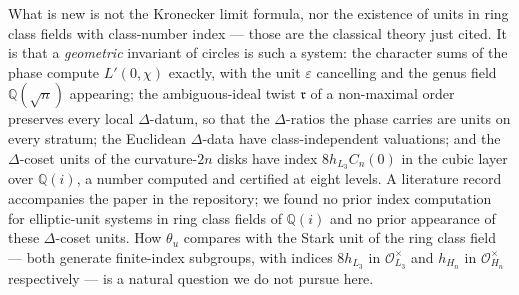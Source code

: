 \documentclass[11pt]{amsart}
\numberwithin{equation}{section}
\theoremstyle{plain}
\theoremstyle{definition}
\theoremstyle{remark}
\newcommand{\Q}{\mathbb{Q}}
\newcommand{\idealr}{\mathfrak{r}}
\newcommand{\Oc}{\mathcal{O}}
\newcommand{\eps}{\varepsilon}
\begin{document}
What is new is not the Kronecker limit formula, nor the existence of
units in ring class fields with class-number index --- those are the
classical theory just cited.  It is that a \emph{geometric} invariant of
circles is such a system: the character sums of the phase compute
$L'(0,\chi)$ exactly, with the unit $\eps$ cancelling and the genus field
$\Q(\sqrt n)$ appearing; the ambiguous-ideal twist $\idealr$ of a
non-maximal order preserves every local $\Delta$-datum, so that the
$\Delta$-ratios the phase carries are units on every stratum; the
Euclidean $\Delta$-data have class-independent valuations; and the
$\Delta$-coset units of the curvature-$2n$ disks have index
$8h_{L_3}C_n(0)$ in the cubic layer over $\Q(i)$, a number computed and
certified at eight levels.  A literature record accompanies the paper in
the repository; we found no prior index computation for elliptic-unit
systems in ring class fields of $\Q(i)$ and no prior appearance of these
$\Delta$-coset units.  How $\theta_u$ compares with the Stark unit of the
ring class field --- both generate finite-index subgroups, with indices
$8h_{L_3}$ in $\Oc_{L_3}^\times$ and $h_{H_n}$ in $\Oc_{H_n}^\times$
respectively --- is a natural question we do not pursue here.
\end{document}
